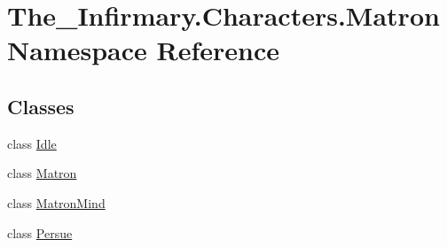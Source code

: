 \hypertarget{namespace_the___infirmary_1_1_characters_1_1_matron}{}\section{The\+\_\+\+Infirmary.\+Characters.\+Matron Namespace Reference}
\label{namespace_the___infirmary_1_1_characters_1_1_matron}
\subsection*{Classes}
\begin{DoxyCompactItemize}
\item 
class \mbox{\hyperlink{class_the___infirmary_1_1_characters_1_1_matron_1_1_idle}{Idle}}
\item 
class \mbox{\hyperlink{class_the___infirmary_1_1_characters_1_1_matron_1_1_matron}{Matron}}
\item 
class \mbox{\hyperlink{class_the___infirmary_1_1_characters_1_1_matron_1_1_matron_mind}{Matron\+Mind}}
\item 
class \mbox{\hyperlink{class_the___infirmary_1_1_characters_1_1_matron_1_1_persue}{Persue}}
\end{DoxyCompactItemize}
